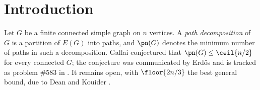 \section{Introduction}\label{sec:intro}

Let $G$ be a finite connected simple graph on $n$ vertices. A \emph{path decomposition} of $G$
is a partition of $E(G)$ into paths, and $\pn(G)$ denotes the minimum number of paths in such a
decomposition. Gallai conjectured that $\pn(G)\le \ceil{n/2}$ for every connected $G$; the
conjecture was communicated by Erd\H{o}s and is tracked as problem \#583 in \cite{EP583}. It
remains open, with $\floor{2n/3}$ the best general bound, due to Dean and Kouider \cite{DK00}.

